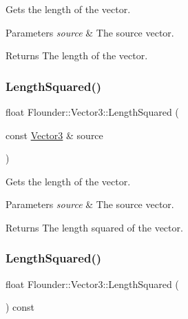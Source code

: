 Gets the length of the vector. 


\begin{DoxyParams}{Parameters}
{\em source} & The source vector. \\
\hline
\end{DoxyParams}
\begin{DoxyReturn}{Returns}
The length of the vector. 
\end{DoxyReturn}
\mbox{\label{class_flounder_1_1_vector3_aac2e9f56ad1eabd58beb24b3fbf3cff4}} 
\subsubsection{\texorpdfstring{Length\+Squared()}{LengthSquared()}\hspace{0.1cm}{\footnotesize\ttfamily [1/2]}}
{\footnotesize\ttfamily float Flounder\+::\+Vector3\+::\+Length\+Squared (\begin{DoxyParamCaption}\item[{const \hyperlink{class_flounder_1_1_vector3}{Vector3} \&}]{source }\end{DoxyParamCaption})\hspace{0.3cm}{\ttfamily [static]}}



Gets the length of the vector. 


\begin{DoxyParams}{Parameters}
{\em source} & The source vector. \\
\hline
\end{DoxyParams}
\begin{DoxyReturn}{Returns}
The length squared of the vector. 
\end{DoxyReturn}
\mbox{\label{class_flounder_1_1_vector3_ae4226363d9a8ca40811a6c750d12a6cf}} 
\subsubsection{\texorpdfstring{Length\+Squared()}{LengthSquared()}\hspace{0.1cm}{\footnotesize\ttfamily [2/2]}}
{\footnotesize\ttfamily float Flounder\+::\+Vector3\+::\+Length\+Squared (\begin{DoxyParamCaption}{ }\end{DoxyParamCaption}) const}



